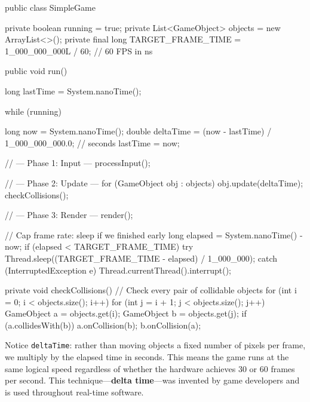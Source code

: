 \documentclass[11pt,letterpaper]{article}
\newcommand{\keyterm}[1]{\textbf{\textcolor{cssecondary}{#1}}}
\begin{document}
\begin{javacode}
public class SimpleGame {
    private boolean running = true;
    private List<GameObject> objects = new ArrayList<>();
    private final long TARGET_FRAME_TIME = 1_000_000_000L / 60; // 60 FPS in ns

    public void run() {
        long lastTime = System.nanoTime();

        while (running) {
            long now = System.nanoTime();
            double deltaTime = (now - lastTime) / 1_000_000_000.0; // seconds
            lastTime = now;

            // --- Phase 1: Input ---
            processInput();

            // --- Phase 2: Update ---
            for (GameObject obj : objects) {
                obj.update(deltaTime);
            }
            checkCollisions();

            // --- Phase 3: Render ---
            render();

            // Cap frame rate: sleep if we finished early
            long elapsed = System.nanoTime() - now;
            if (elapsed < TARGET_FRAME_TIME) {
                try {
                    Thread.sleep((TARGET_FRAME_TIME - elapsed) / 1_000_000);
                } catch (InterruptedException e) {
                    Thread.currentThread().interrupt();
                }
            }
        }
    }

    private void checkCollisions() {
        // Check every pair of collidable objects
        for (int i = 0; i < objects.size(); i++) {
            for (int j = i + 1; j < objects.size(); j++) {
                GameObject a = objects.get(i);
                GameObject b = objects.get(j);
                if (a.collidesWith(b)) {
                    a.onCollision(b);
                    b.onCollision(a);
                }
            }
        }
    }
}
\end{javacode}

Notice \texttt{deltaTime}: rather than moving objects a fixed number of pixels per frame, we multiply by the elapsed time in seconds. This means the game runs at the same logical speed regardless of whether the hardware achieves 30 or 60 frames per second. This technique---\keyterm{delta time}---was invented by game developers and is used throughout real-time software.
\end{document}
